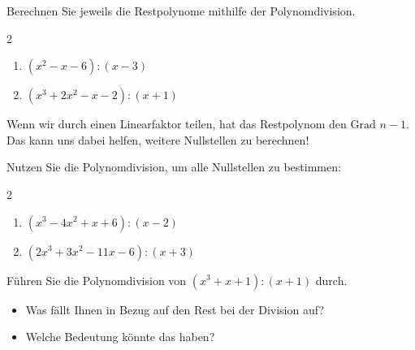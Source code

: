 \documentclass[11pt, a4paper, oneside]{article}
\begin{document}
	
	Berechnen Sie jeweils die Restpolynome mithilfe der Polynomdivision.
	
	\begin{multicols}{2}
		\begin{enumerate}[label=\alph*)]
			\item $(x^2 - x - 6) : (x - 3)$
			\item $(x^3 + 2x^2 - x - 2) : (x + 1)$
		\end{enumerate}
	\end{multicols}
	
	\checkered[11cm]
	
	
	Wenn wir durch einen Linearfaktor teilen, hat das Restpolynom den Grad $n-1$.
	Das kann uns dabei helfen, weitere Nullstellen zu berechnen!
	
	Nutzen Sie die Polynomdivision, um alle Nullstellen zu bestimmen:
	
	\begin{multicols}{2}
		\begin{enumerate}[label=\alph*)]
			\item $(x^3 - 4x^2 + x + 6) : (x - 2)$
			\item $(2x^3 + 3x^2 - 11x - 6) : (x + 3)$
		\end{enumerate}
	\end{multicols}
	
	\checkered[13cm]
	
	
	Führen Sie die Polynomdivision von $(x^3 + x + 1) : (x + 1)$ durch.
	
	\begin{itemize}
		\item Was fällt Ihnen in Bezug auf den Rest bei der Division auf?
		\item Welche Bedeutung könnte das haben?
	\end{itemize}
\end{document}
